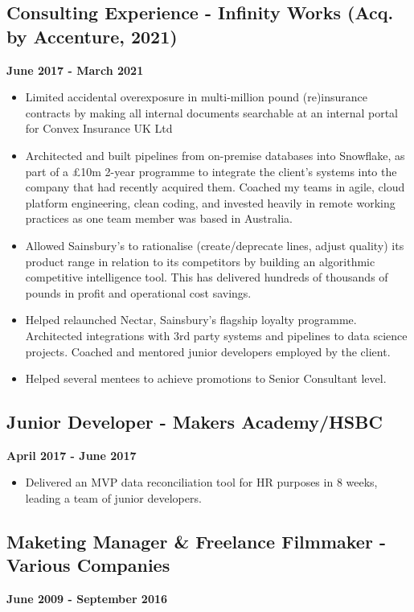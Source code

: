 \documentclass[a4paper]{scrartcl}
\begin{document}
\subsection*{Consulting Experience - Infinity Works (Acq. by Accenture, 2021)}
\textbf{June 2017 - March 2021}
\begin{itemize}
	\item Limited accidental overexposure in multi-million pound
	      (re)insurance contracts by making
	      all internal documents searchable at an internal portal for Convex
	      Insurance UK Ltd
	\item Architected and built pipelines from on-premise databases into
	      Snowflake, as part of a £10m 2-year programme to integrate the
	      client's systems into the company that had recently acquired them.
	      Coached my teams in agile, cloud platform engineering, clean
	      coding,
	      and invested heavily in remote working practices as one team member
	      was based
	      in Australia.
	\item Allowed Sainsbury's to rationalise (create/deprecate lines, adjust
	      quality) its product range in relation to its competitors by
	      building an
	      algorithmic competitive intelligence tool. This has delivered
	      hundreds of
	      thousands of pounds in profit and operational cost savings.
	\item Helped relaunched Nectar, Sainsbury's flagship
	      loyalty programme. Architected integrations with 3rd party systems
	      and pipelines to data science projects. Coached and mentored junior
	      developers
	      employed by the client.
	\item Helped several mentees to achieve
	      promotions to Senior Consultant level.
\end{itemize}

\subsection*{Junior Developer - Makers Academy/HSBC}
\textbf{April 2017 - June 2017}
\begin{itemize}
	\item Delivered an MVP data reconciliation tool for HR purposes in 8
	      weeks, leading a team of junior developers.
\end{itemize}

\subsection*{Maketing Manager \& Freelance Filmmaker - Various Companies}
\textbf{June 2009 - September 2016}
\end{document}
